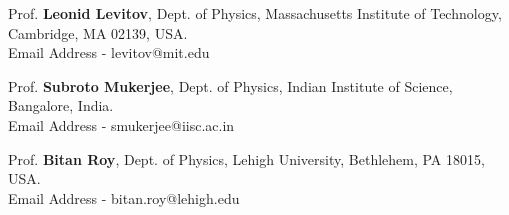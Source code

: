 

\begin{cventries}

\begin{cvitems}

  \item{Prof. \textbf{Leonid Levitov},} %
	{Dept. of Physics, Massachusetts Institute of Technology, Cambridge, MA 02139, USA.} %
	{} %
	{\\}
	{Email Address - levitov@mit.edu} %
  \item{Prof. \textbf{Subroto Mukerjee},} %
	{Dept. of Physics, Indian Institute of Science, Bangalore, India.} %
	{} %
	{\\}
	{Email Address - smukerjee@iisc.ac.in} %
  \item{Prof. \textbf{Bitan Roy},} %
	{Dept. of Physics, Lehigh University, Bethlehem, PA 18015, USA.} %
	{} %
	{\\}
	{Email Address - bitan.roy@lehigh.edu} %


\end{cvitems}
\end{cventries}
